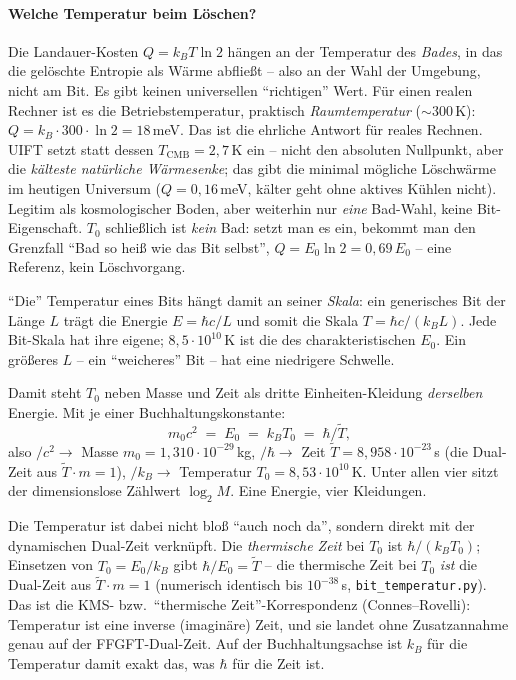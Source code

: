 \paragraph{Welche Temperatur beim Löschen?} Die Landauer-Kosten $Q=k_B T\ln2$ hängen an der Temperatur
des \emph{Bades}, in das die gelöschte Entropie als Wärme abfließt -- also an der Wahl der Umgebung, nicht
am Bit. Es gibt keinen universellen \enquote{richtigen} Wert. Für einen realen Rechner ist es die
Betriebstemperatur, praktisch \emph{Raumtemperatur} ($\sim300$\,K): $Q=k_B\cdot300\cdot\ln2=18$\,meV. Das
ist die ehrliche Antwort für reales Rechnen. UIFT setzt statt dessen $T_\text{CMB}=2{,}7$\,K ein -- nicht
den absoluten Nullpunkt, aber die \emph{kälteste natürliche Wärmesenke}; das gibt die minimal mögliche
Löschwärme im heutigen Universum ($Q=0{,}16$\,meV, kälter geht ohne aktives Kühlen nicht). Legitim als
kosmologischer Boden, aber weiterhin nur \emph{eine} Bad-Wahl, keine Bit-Eigenschaft. $T_0$ schließlich
ist \emph{kein} Bad: setzt man es ein, bekommt man den Grenzfall \enquote{Bad so heiß wie das Bit selbst},
$Q=E_0\ln2=0{,}69\,E_0$ -- eine Referenz, kein Löschvorgang.

\enquote{Die} Temperatur eines Bits hängt damit an seiner \emph{Skala}: ein generisches Bit der Länge $L$
trägt die Energie $E=\hbar c/L$ und somit die Skala $T=\hbar c/(k_B L)$. Jede Bit-Skala hat ihre eigene;
$8{,}5\cdot10^{10}$\,K ist die des charakteristischen $E_0$. Ein größeres $L$ -- ein \enquote{weicheres}
Bit -- hat eine niedrigere Schwelle.

Damit steht $T_0$ neben Masse und Zeit als dritte Einheiten-Kleidung \emph{derselben} Energie. Mit je
einer Buchhaltungskonstante:
\[
m_0 c^2 \;=\; E_0 \;=\; k_B T_0 \;=\; \hbar/\tilde T,
\]
also $/c^2\to$ Masse $m_0=1{,}310\cdot10^{-29}$\,kg, $/\hbar\to$ Zeit $\tilde T=8{,}958\cdot10^{-23}$\,s
(die Dual-Zeit aus $\tilde T\cdot m=1$), $/k_B\to$ Temperatur $T_0=8{,}53\cdot10^{10}$\,K. Unter allen vier
sitzt der dimensionslose Zählwert $\log_2 M$. Eine Energie, vier Kleidungen.

Die Temperatur ist dabei nicht bloß \enquote{auch noch da}, sondern direkt mit der dynamischen Dual-Zeit
verknüpft. Die \emph{thermische Zeit} bei $T_0$ ist $\hbar/(k_B T_0)$; Einsetzen von $T_0=E_0/k_B$ gibt
$\hbar/E_0=\tilde T$ -- die thermische Zeit bei $T_0$ \emph{ist} die Dual-Zeit aus $\tilde T\cdot m=1$
(numerisch identisch bis $10^{-38}$\,s, \texttt{bit\_temperatur.py}). Das ist die KMS- bzw.\
\enquote{thermische Zeit}-Korrespondenz (Connes--Rovelli): Temperatur ist eine inverse (imaginäre) Zeit,
und sie landet ohne Zusatzannahme genau auf der FFGFT-Dual-Zeit. Auf der Buchhaltungsachse ist $k_B$ für
die Temperatur damit exakt das, was $\hbar$ für die Zeit ist.

